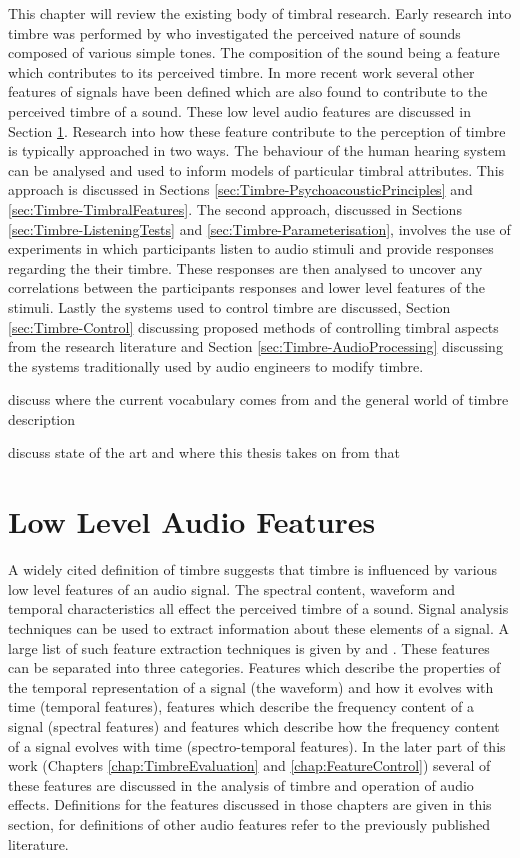 	This chapter will review the existing body of timbral research. Early research into timbre was performed by
	\citet{helmholtz1875on} who investigated the perceived nature of sounds composed of various simple tones. The
	composition of the sound being a feature which contributes to its perceived timbre. In more recent work several
	other features of signals have been defined which are also found to contribute to the perceived timbre of a sound.
	These low level audio features are discussed in Section \ref{sec:Timbre-LowLevelFeatures}. Research into how these
	feature contribute to the perception of timbre is typically approached in two ways. The behaviour of the human
	hearing system can be analysed and used to inform models of particular timbral attributes. This approach is
	discussed in Sections \ref{sec:Timbre-PsychoacousticPrinciples} and \ref{sec:Timbre-TimbralFeatures}. The second
	approach, discussed in Sections \ref{sec:Timbre-ListeningTests} and \ref{sec:Timbre-Parameterisation}, involves the
	use of experiments in which participants listen to audio stimuli and provide responses regarding the their timbre.
	These responses are then analysed to uncover any correlations between the participants responses and lower level
	features of the stimuli. Lastly the systems used to control timbre are discussed, Section \ref{sec:Timbre-Control}
	discussing proposed methods of controlling timbral aspects from the research literature and Section
	\ref{sec:Timbre-AudioProcessing} discussing the systems traditionally used by audio engineers to modify timbre.

	\note
	{
		discuss where the current vocabulary comes from and the general world of timbre description

		discuss state of the art and where this thesis takes on from that
	}

\section{Low Level Audio Features}
\label{sec:Timbre-LowLevelFeatures}
	A widely cited definition of timbre \citep{ASA1960american} suggests that timbre is influenced by various low level
	features of an audio signal. The spectral content, waveform and temporal characteristics all effect the perceived
	timbre of a sound. Signal analysis techniques can be used to extract information about these elements of a signal.
	A large list of such feature extraction techniques is given by \citet{peeters2004a} and
	\citet{bullock2008implementing}. These features can be separated into three categories. Features which describe the
	properties of the temporal representation of a signal (the waveform) and how it evolves with time (temporal
	features), features which describe the frequency content of a signal (spectral features) and features which
	describe how the frequency content of a signal evolves with time (spectro-temporal features). In the later part of
	this work (Chapters \ref{chap:TimbreEvaluation} and \ref{chap:FeatureControl}) several of these features are
	discussed in the analysis of timbre and operation of audio effects. Definitions for the features discussed in those
	chapters are given in this section, for definitions of other audio features refer to the previously published
	literature.

